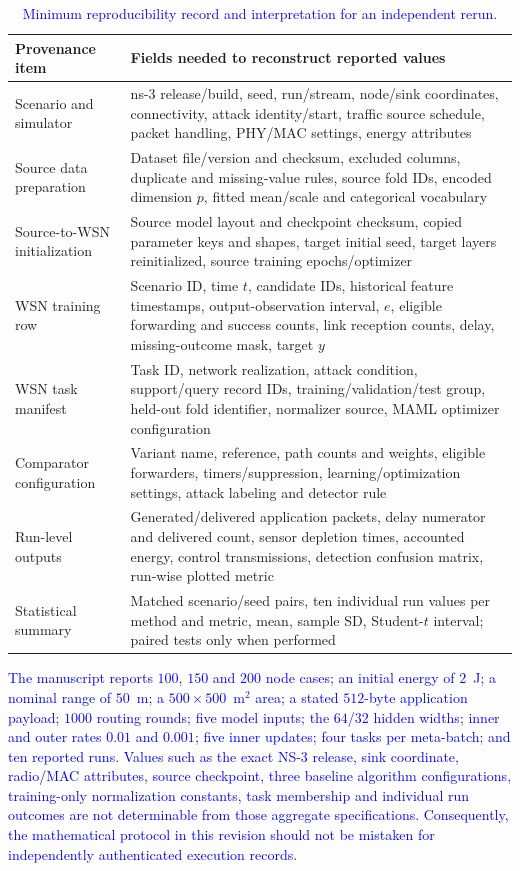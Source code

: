 \documentclass[pdflatex,sn-mathphys-num]{sn-jnl}
\newcommand{\Revised}[1]{\textcolor{blue}{#1}}
\begin{document}
\begin{table}[ht]
\centering\footnotesize
\caption{\Revised{Minimum reproducibility record and interpretation for an independent rerun.}}
\label{tab:appendix_traceability_final}
\begin{tabular}{p{}p{}}
\toprule
\textbf{Provenance item} & \textbf{Fields needed to reconstruct reported values}\\
\midrule
Scenario and simulator & ns-3 release/build, seed, run/stream, node/sink coordinates, connectivity, attack identity/start, traffic source schedule, packet handling, PHY/MAC settings, energy attributes\\
Source data preparation & Dataset file/version and checksum, excluded columns, duplicate and missing-value rules, source fold IDs, encoded dimension $p$, fitted mean/scale and categorical vocabulary\\
Source-to-WSN initialization & Source model layout and checkpoint checksum, copied parameter keys and shapes, target initial seed, target layers reinitialized, source training epochs/optimizer\\
WSN training row & Scenario ID, time $t$, candidate IDs, historical feature timestamps, output-observation interval, $e$, eligible forwarding and success counts, link reception counts, delay, missing-outcome mask, target $y$\\
WSN task manifest & Task ID, network realization, attack condition, support/query record IDs, training/validation/test group, held-out fold identifier, normalizer source, MAML optimizer configuration\\
Comparator configuration & Variant name, reference, path counts and weights, eligible forwarders, timers/suppression, learning/optimization settings, attack labeling and detector rule\\
Run-level outputs & Generated/delivered application packets, delay numerator and delivered count, sensor depletion times, accounted energy, control transmissions, detection confusion matrix, run-wise plotted metric\\
Statistical summary & Matched scenario/seed pairs, ten individual run values per method and metric, mean, sample SD, Student-$t$ interval; paired tests only when performed\\
\bottomrule
\end{tabular}
\end{table}

\Revised{The manuscript reports $100$, $150$ and $200$ node cases; an initial energy of $2$~J; a nominal range of $50$~m; a $500\times500$~m$^2$ area; a stated $512$-byte application payload; $1000$ routing rounds; five model inputs; the $64$/$32$ hidden widths; inner and outer rates $0.01$ and $0.001$; five inner updates; four tasks per meta-batch; and ten reported runs. Values such as the exact NS-3 release, sink coordinate, radio/MAC attributes, source checkpoint, three baseline algorithm configurations, training-only normalization constants, task membership and individual run outcomes are not determinable from those aggregate specifications. Consequently, the mathematical protocol in this revision should not be mistaken for independently authenticated execution records.}
\end{document}
